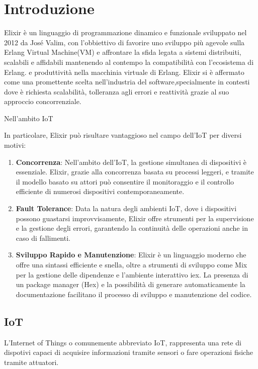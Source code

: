 \chapter{Introduzione}

Elixir è un linguaggio di programmazione dinamico e funzionale
sviluppato nel 2012 da José Valim,
con l'obbiettivo di favorire uno sviluppo più agevole
sulla Erlang Virtual Machine(VM) e affrontare la sfida legata
a sistemi distribuiti, scalabili e affidabili mantenendo al
contempo la compatibilità con l'ecosistema di Erlang.
e produttività nella macchinia virtuale di Erlang.
Elixir si è affermato come una promettente scelta
nell'industria del software,specialmente in contesti dove è
richiesta scalabilità, tolleranza agli errori e reattività 
grazie al suo approccio concorrenziale.

Nell'ambito IoT 

In particolare, Elixir può risultare vantaggioso nel
campo dell'IoT per diversi motivi:
\begin{enumerate}
	\item \textbf{Concorrenza}: Nell'ambito dell'IoT, la gestione
	simultanea di dispositivi è essenziale.
	Elixir, grazie alla concorrenza basata su processi leggeri,
	e tramite il modello basato su attori può consentire il monitoraggio
	e il controllo efficiente di numerosi dispositivi contemporaneamente.
	\item \textbf{Fault Tolerance}: 
	Data la natura degli ambienti IoT, dove i dispositivi possono
	guastarsi improvvisamente, Elixir offre strumenti per la supervisione
	e la gestione degli errori, garantendo la continuità delle operazioni
	anche in caso di fallimenti.
	\item \textbf{Sviluppo Rapido e Manutenzione}:
	Elixir è un linguaggio moderno che offre una sintassi efficiente e snella,
	oltre a strumenti di sviluppo come Mix per la gestione delle dipendenze
	e l'ambiente interattivo iex. La presenza di un package manager (Hex)\cite{Hex15:online}
	e la possibilità di generare automaticamente la documentazione
	facilitano il processo di sviluppo e manutenzione del codice.
	
\end{enumerate}

\section{IoT}

L'Internet of Things o comunemente abbreviato IoT, rappresenta una
rete di dispotivi capaci di acquisire informazioni tramite sensori
o fare operazioni fisiche tramite attuatori.

